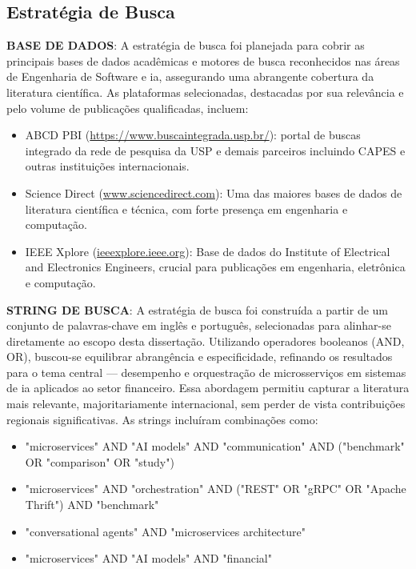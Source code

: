 \subsection{Estratégia de Busca}

\textbf{BASE DE DADOS}: A estratégia de busca foi planejada para cobrir as principais bases de dados acadêmicas e motores de busca reconhecidos nas áreas de Engenharia de Software e \acrfull{ia}, assegurando uma abrangente cobertura da literatura científica. As plataformas selecionadas, destacadas por sua relevância e pelo volume de publicações qualificadas, incluem:
\begin{itemize}
    \item ABCD PBI (\url{https://www.buscaintegrada.usp.br/}): portal de buscas integrado da rede de pesquisa da USP e demais parceiros incluindo CAPES e outras instituições internacionais.
    \item Science Direct (\url{www.sciencedirect.com}): Uma das maiores bases de dados de literatura científica e técnica, com forte presença em engenharia e computação.
    \item IEEE Xplore (\url{ieeexplore.ieee.org}): Base de dados do Institute of Electrical and Electronics Engineers, crucial para publicações em engenharia, eletrônica e computação.
\end{itemize}

\textbf{STRING DE BUSCA}: A estratégia de busca foi construída a partir de um conjunto de palavras-chave em inglês e português, selecionadas para alinhar-se diretamente ao escopo desta dissertação. Utilizando operadores booleanos (AND, OR), buscou-se equilibrar abrangência e especificidade, refinando os resultados para o tema central — desempenho e orquestração de microsserviços em sistemas de \acrfull{ia} aplicados ao setor financeiro. Essa abordagem permitiu capturar a literatura mais relevante, majoritariamente internacional, sem perder de vista contribuições regionais significativas. As strings incluíram combinações como:

\begin{itemize}
\item "microservices" AND "AI models" AND "communication" AND ("benchmark" OR "comparison" OR "study")
\item "microservices" AND "orchestration" AND ("REST" OR "gRPC" OR "Apache Thrift") AND "benchmark"
\item "conversational agents" AND "microservices architecture"
\item "microservices" AND "AI models" AND "financial"
\end{itemize}

